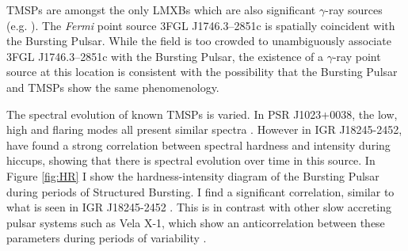 \par TMSPs are amongst the only LMXBs which are also significant $\gamma$-ray sources (e.g. \citealp{Hill_XSS}). The \textit{Fermi} point source 3FGL J1746.3--2851c is spatially coincident with the Bursting Pulsar. While the field is too crowded to unambiguously associate 3FGL J1746.3--2851c with the Bursting Pulsar, the existence of a $\gamma$-ray point source at this location is consistent with the possibility that the Bursting Pulsar and TMSPs show the same phenomenology.

\par The spectral evolution of known TMSPs is varied. In PSR J1023+0038, the low, high and flaring modes all present similar spectra \citep{Bogdanov_TMSPVar}. However in IGR J18245-2452, \citealp{Ferrigno_TMSPVar} have found a strong correlation between spectral hardness and intensity during hiccups, showing that there is spectral evolution over time in this source. In Figure \ref{fig:HR} I show the hardness-intensity diagram of the Bursting Pulsar during periods of Structured Bursting. I find a significant correlation, similar to what is seen in IGR J18245-2452 \citep{Ferrigno_TMSPVar}. This is in contrast with other slow accreting pulsar systems such as Vela X-1, which show an anticorrelation between these parameters during periods of variability \citep{Kreykenbohm_Vela}.

